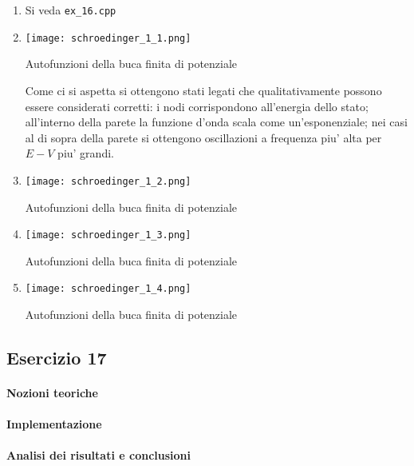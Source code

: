 \begin{enumerate}

	\item Si veda \texttt{ex\_16.cpp}

	\item

	      \begin{marginfigure}
		      \texttt{[image: schroedinger\_1\_1.png]}
		      \caption{Autofunzioni della buca finita di potenziale}
		      \label{fig:schroedinger_1_1}
	      \end{marginfigure}

	      Come ci si aspetta si ottengono stati legati che qualitativamente possono essere considerati corretti: i nodi corrispondono all'energia dello stato; all'interno della parete la funzione d'onda scala come un'esponenziale; nei casi al di sopra della parete si ottengono oscillazioni a frequenza piu' alta per $E-V$ piu' grandi.


	\item
	      \begin{marginfigure}
		      \texttt{[image: schroedinger\_1\_2.png]}
		      \caption{Autofunzioni della buca finita di potenziale}
		      \label{fig:schroedinger_1_2}
	      \end{marginfigure}
	\item


	      \begin{marginfigure}
		      \texttt{[image: schroedinger\_1\_3.png]}
		      \caption{Autofunzioni della buca finita di potenziale}
		      \label{fig:schroedinger_1_3}
	      \end{marginfigure}
	\item


	      \begin{marginfigure}
		      \texttt{[image: schroedinger\_1\_4.png]}
		      \caption{Autofunzioni della buca finita di potenziale}
		      \label{fig:schroedinger_1_4}
	      \end{marginfigure}

\end{enumerate}

\subsection{Esercizio 17}

\paragraph{Nozioni teoriche}

\paragraph{Implementazione}

\paragraph{Analisi dei risultati e conclusioni}






